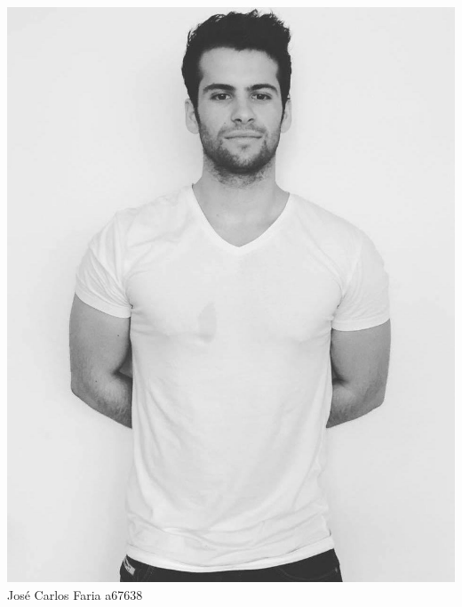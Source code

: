 \begin{titlepage}
\begin{center}
\begin{minipage}[b]{.2\textwidth}
	\includegraphics[scale=0.153]{carlos}
	\small{José Carlos Faria a67638}
\end{minipage}
\hfill
\begin{minipage}[b]{.2\textwidth}

\end{minipage}
\end{center}
\end{titlepage}
